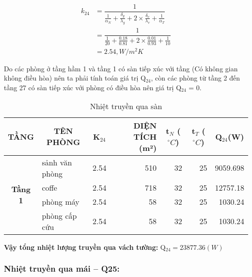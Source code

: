 {\Large \begin{equation*}
	\begin{split}
		k_{24} &= \dfrac{1}{\frac{1}{\alpha_{N}} + \frac{\delta_{g}}{\lambda_{g}} + 2\times\frac{\delta_{v}}{\lambda_{v}} + \frac{1}{\alpha_{T}}}\\
		&= \dfrac{1}{\frac{1}{20} + \frac{0.18}{0.81} + 2\times\frac{0.01}{0.93} + \frac{1}{10}}\\
		&={\scriptstyle 2.54, W/m^2 K}
	\end{split}
\end{equation*}}

Do các phòng ở tầng hầm 1 và tầng 1 có sàn tiếp xúc với tầng (Có không gian không điều hòa) nên ta phải tính toán giá trị Q$ _{24} $, còn các phòng từ tầng 2 đến tầng 27 có sàn tiếp xúc với phòng có điều hòa nên giá trị Q$ _{24} $ = 0.

\begin{table}[H]
	\centering
	\caption{Nhiệt truyền qua sàn}
	\begin{tabular}{|c|l|r|r|r|r|r|}
		\hline
		\textbf{ TẦNG} & \multicolumn{1}{c|}{\textbf{TÊN PHÒNG}} & \multicolumn{1}{c|}{\textbf{K$ _{24} $}} & \multicolumn{1}{p{6.145em}|}{\textbf{DIỆN TÍCH (m²) }} & \multicolumn{1}{c|}{\textbf{t$_{N}$ ($^{\circ}C$)}} & \multicolumn{1}{c|}{\textbf{t$_{T}$ ($^{\circ}C$)}} & \multicolumn{1}{c|}{\textbf{Q$ _{24} $(W)}} \bigstrut\\
		\hline
		\multirow{4}[8]{*}{\textbf{Tầng 1}} & sảnh văn phòng & 2.54  & 510   & 32    & 25    & 9059.698 \bigstrut\\
		\cline{2-7}          & coffe & 2.54  & 718   & 32    & 25    & 12757.18 \bigstrut\\
		\cline{2-7}          & phòng máy & 2.54  & 58    & 32    & 25    & 1030.24 \bigstrut\\
		\cline{2-7}          & phòng cấp cứu & 2.54  & 58    & 32    & 25    & 1030.24 \bigstrut\\
		\hline
	\end{tabular}%
	\label{tab:addlabel}%
\end{table}%
\textbf{Vậy tổng nhiệt lượng truyền qua vách tường:} Q$_{24} = 23877.36(W)$

\subsubsection{Nhiệt truyền qua mái -- Q{\scriptsize 25}:}

